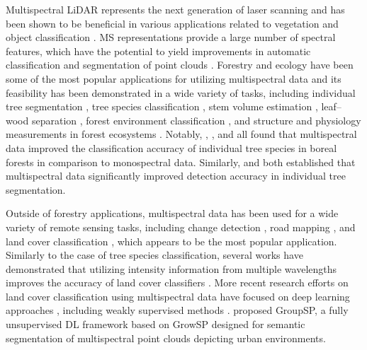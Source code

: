 Multispectral LiDAR represents the next generation of laser scanning and has been shown to be beneficial in various applications related to vegetation and object classification \citep{kaasalainen2007toward, kaasalainen2019multispectral}. MS representations provide a large number of spectral features, which have the potential to yield improvements in automatic classification and segmentation of point clouds \citep{kaasalainen2007toward}. Forestry and ecology have been some of the most popular applications for utilizing multispectral data \citep{takhtkesha2024multispectral} and its feasibility has been demonstrated in a wide variety of tasks, including individual tree segmentation \citep[see e.g.][]{dai2018new,huo2020individual}, tree species classification \cite[see e.g][]{yu2017single,budei2018identifying,lindeberg2021classification}, stem volume estimation \citep{axelsson2023use}, leaf--wood separation \citep{li2013separating,howe2015capabilities,li2018utilization}, forest environment classification \citep{hopkinson2016multisensor}, and structure and physiology measurements in forest ecosystems \citep{woodhouse2011multispectral}. Notably, \cite{yu2017single}, \cite{kukkonen2019multispectral}, and \cite{hakula2023individual} all found that multispectral data improved the classification accuracy of individual tree species in boreal forests in comparison to monospectral data. Similarly, \cite{dai2018new} and \cite{huo2020individual} both established that multispectral data significantly improved detection accuracy in individual tree segmentation.

Outside of forestry applications, multispectral data has been used for a wide variety of remote sensing tasks, including change detection \citep{matikainen2017object,matikainen2019toward}, road mapping \citep{karila2017feasibility}, and land cover classification \citep{wang2014airborne,wichmann2015evaluating,bakula2016testing,teo2017analysis}, which appears to be the most popular application. Similarly to the case of tree species classification, several works have demonstrated that utilizing intensity information from multiple wavelengths improves the accuracy of land cover classifiers \citep{wang2014airborne,matikainen2017object,teo2017analysis}. More recent research efforts on land cover classification using multispectral data have focused on deep learning approaches \citep{yu2020hybrid,pan2020landcover,wang2021multi,li2022agfpnet,zhang2022introducing}, including weakly supervised methods \citep{chen2024feature,takhtkeshha2024automatic}. \cite{oinonen2024unsupervised} proposed GroupSP, a fully unsupervised DL framework based on GrowSP designed for semantic segmentation of multispectral point clouds depicting urban environments.

